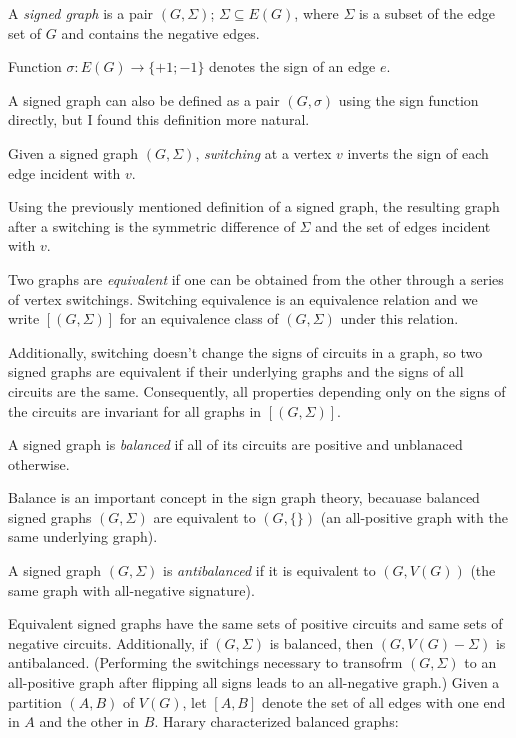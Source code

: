 A \textit{signed graph} is a pair $(G, \Sigma)$; $\Sigma \subseteq E(G)$, where $\Sigma$ is a subset of the edge set of $G$ and contains the negative edges.

Function $\sigma : E(G) \rightarrow \{+1; -1\}$ denotes the sign of an edge $e$.

A signed graph can also be defined as a pair $(G, \sigma)$ using the sign function directly,
but I found this definition more natural.

Given a signed graph $(G, \Sigma)$, \textit{switching} at a vertex $v$ inverts the sign of each edge
incident with $v$. 

Using the previously mentioned definition of a signed graph, the resulting graph after a switching
is the symmetric difference of $\Sigma$ and the set of edges incident with $v$.

Two graphs are \textit{equivalent} if one can be obtained from the other through a series of vertex switchings.
Switching equivalence is an equivalence relation and we write $[(G, \Sigma)]$ for an equivalence class of $(G, \Sigma)$ under this relation.

Additionally, switching doesn't change the signs of circuits in a graph, so two signed graphs 
are equivalent if their underlying graphs and the signs of all circuits are the same. 
Consequently, all properties depending only on the signs of the circuits are invariant for all graphs in $[(G, \Sigma)]$.

A signed graph is \textit{balanced} if all of its circuits are positive and unblanaced otherwise.

Balance is an important concept in the sign graph theory, becauase balanced signed graphs $(G, \Sigma)$ are equivalent to $(G, \{\})$ (an all-positive graph with the same underlying graph).

A signed graph $(G, \Sigma)$ is \textit{antibalanced} if it is equivalent to $(G, V(G))$ (the same graph with all-negative signature).

Equivalent signed graphs have the same sets of positive circuits and same sets of negative circuits.
Additionally, if $(G, \Sigma)$ is balanced, then $(G, V(G) - \Sigma)$ is antibalanced. (Performing the switchings necessary to transofrm $(G, \Sigma)$ to an all-positive graph after flipping all signs leads to an all-negative graph.)
Given a partition $(A, B)$ of $V(G)$, let $[A, B]$ denote the set of all edges with one end in $A$ and the other in $B$.
Harary\cite{harary} characterized balanced graphs:

